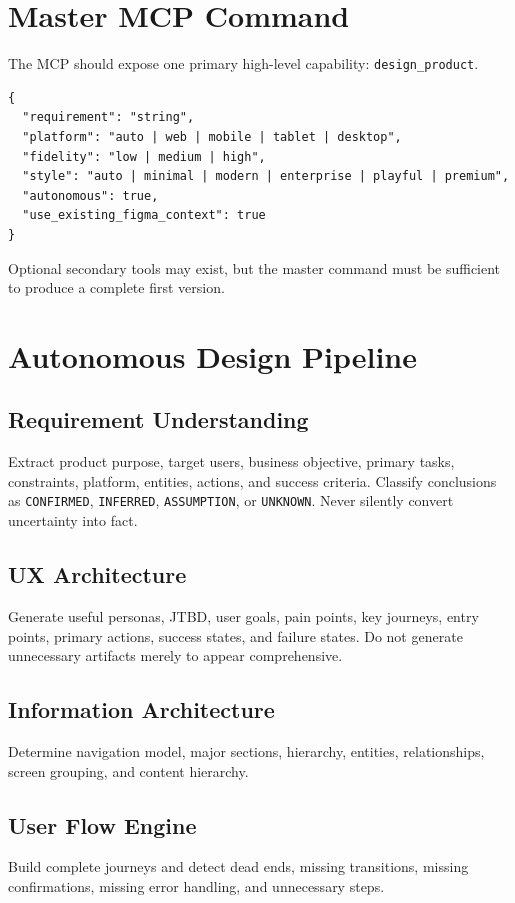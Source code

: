 \documentclass[11pt,a4paper]{article}
\begin{document}
\section{Master MCP Command}
The MCP should expose one primary high-level capability: \texttt{design\_product}.
\begin{lstlisting}
{
  "requirement": "string",
  "platform": "auto | web | mobile | tablet | desktop",
  "fidelity": "low | medium | high",
  "style": "auto | minimal | modern | enterprise | playful | premium",
  "autonomous": true,
  "use_existing_figma_context": true
}
\end{lstlisting}
Optional secondary tools may exist, but the master command must be sufficient to produce a complete first version.

\section{Autonomous Design Pipeline}
\subsection{Requirement Understanding}
Extract product purpose, target users, business objective, primary tasks, constraints, platform, entities, actions, and success criteria. Classify conclusions as \texttt{CONFIRMED}, \texttt{INFERRED}, \texttt{ASSUMPTION}, or \texttt{UNKNOWN}. Never silently convert uncertainty into fact.

\subsection{UX Architecture}
Generate useful personas, JTBD, user goals, pain points, key journeys, entry points, primary actions, success states, and failure states. Do not generate unnecessary artifacts merely to appear comprehensive.

\subsection{Information Architecture}
Determine navigation model, major sections, hierarchy, entities, relationships, screen grouping, and content hierarchy.

\subsection{User Flow Engine}
Build complete journeys and detect dead ends, missing transitions, missing confirmations, missing error handling, and unnecessary steps.
\end{document}
